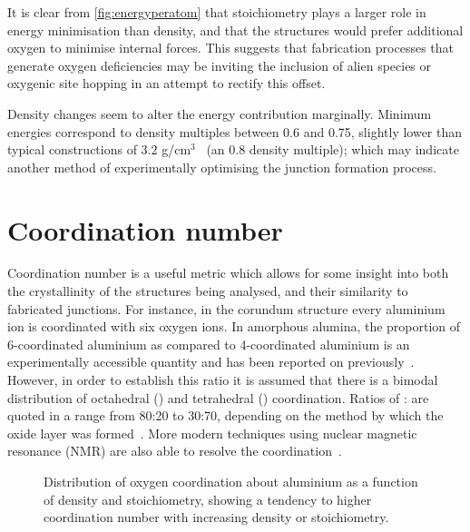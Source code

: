 It is clear from \cref{fig:energyperatom} that stoichiometry plays a larger role in energy minimisation than density, and that the structures would prefer additional oxygen to minimise internal forces.
This suggests that fabrication processes that generate oxygen deficiencies may be inviting the inclusion of alien species or oxygenic site hopping in an attempt to rectify this offset.

Density changes seem to alter the energy contribution marginally.
Minimum energies correspond to density multiples between 0.6 and 0.75, slightly lower than typical constructions of $3.2$ g/cm$^\text{3}$~\cite{Barbour1998} (an 0.8 density multiple); which may indicate another method of experimentally optimising the junction formation process.

\section{Coordination number}
Coordination number is a useful metric which allows for some insight into both the crystallinity of the structures being analysed, and their similarity to fabricated junctions. For instance, in the corundum structure every aluminium ion is coordinated with six oxygen ions. In amorphous alumina, the proportion of 6-coordinated aluminium as compared to 4-coordinated aluminium is an experimentally accessible quantity and has been reported on previously~\cite{ElMashri1983}. However, in order to establish this ratio it is assumed that there is a bimodal distribution of octahedral () and tetrahedral () coordination. Ratios of : are quoted in a range from 80:20 to 30:70, depending on the method by which the oxide layer was formed~\cite{Bourdillon1984}. More modern techniques using nuclear magnetic resonance (NMR) are also able to resolve the  coordination~\cite{Lee2009}.


\begin{figure}[htp]
\centering
\resizebox{\textwidth}{!}{}
\caption[Oxygen Coordination]{\label{fig:coordinationnumber}Distribution of oxygen coordination about aluminium as a function of density and stoichiometry, showing a tendency to higher coordination number with increasing density or stoichiometry.}%
\end{figure}


